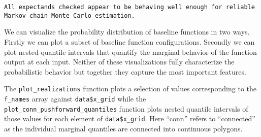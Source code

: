 \documentclass[
  letterpaper,
  DIV=11,
  numbers=noendperiod]{scrartcl}
\newenvironment{Shaded}{\begin{snugshade}}{\end{snugshade}}
\newcommand{\FunctionTok}[1]{\textcolor[rgb]{0.28,0.35,0.67}{#1}}
\newcommand{\NormalTok}[1]{\textcolor[rgb]{0.00,0.23,0.31}{#1}}
\newcommand{\OtherTok}[1]{\textcolor[rgb]{0.00,0.23,0.31}{#1}}
\newcommand{\SpecialCharTok}[1]{\textcolor[rgb]{0.37,0.37,0.37}{#1}}
\newcommand{\StringTok}[1]{\textcolor[rgb]{0.13,0.47,0.30}{#1}}
\begin{document}
\begin{Shaded}
\end{Shaded}

\begin{verbatim}
All expectands checked appear to be behaving well enough for reliable
Markov chain Monte Carlo estimation.
\end{verbatim}

We can visualize the probability distribution of baseline functions in
two ways. Firstly we can plot a subset of baseline function
configurations. Secondly we can plot nested quantile intervals that
quantify the marginal behavior of the function output at each input.
Neither of these visualizations fully characterize the probabilistic
behavior but together they capture the most important features.

The \texttt{plot\_realizations} function plots a selection of values
corresponding to the \texttt{f\_names} array against
\texttt{data\$x\_grid} while the
\texttt{plot\_conn\_pushforward\_quantiles} function plots nested
quantile intervals of those values for each element of
\texttt{data\$x\_grid}. Here ``conn'' refers to ``connected'' as the
individual marginal quantiles are connected into continuous polygons.
\end{document}
